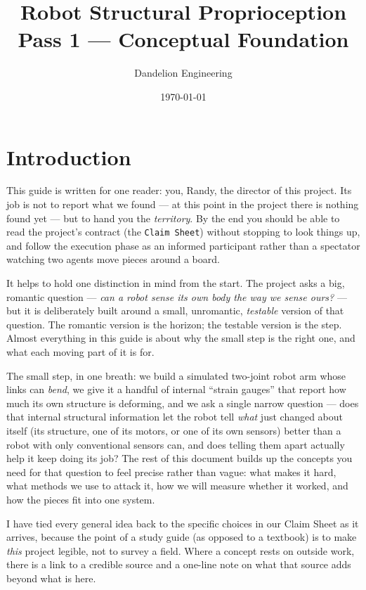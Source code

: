 \documentclass[12pt]{article}
\title{Robot Structural Proprioception \\ Pass 1 --- Conceptual Foundation}
\author{Dandelion Engineering}
\date{\today}
\begin{document}
\maketitle
\begingroup
\small
\setlength{\parskip}{0pt}
\tableofcontents
\endgroup
\newpage

\section{Introduction}

This guide is written for one reader: you, Randy, the director of this project. Its job is not to report what we found --- at this point in the project there is nothing found yet --- but to hand you the \emph{territory}. By the end you should be able to read the project's contract (the \texttt{Claim Sheet}) without stopping to look things up, and follow the execution phase as an informed participant rather than a spectator watching two agents move pieces around a board.

It helps to hold one distinction in mind from the start. The project asks a big, romantic question --- \emph{can a robot sense its own body the way we sense ours?} --- but it is deliberately built around a small, unromantic, \emph{testable} version of that question. The romantic version is the horizon; the testable version is the step. Almost everything in this guide is about why the small step is the right one, and what each moving part of it is for.

The small step, in one breath: we build a simulated two-joint robot arm whose links can \emph{bend}, we give it a handful of internal ``strain gauges'' that report how much its own structure is deforming, and we ask a single narrow question --- does that internal structural information let the robot tell \emph{what} just changed about itself (its structure, one of its motors, or one of its own sensors) better than a robot with only conventional sensors can, and does telling them apart actually help it keep doing its job? The rest of this document builds up the concepts you need for that question to feel precise rather than vague: what makes it hard, what methods we use to attack it, how we will measure whether it worked, and how the pieces fit into one system.

I have tied every general idea back to the specific choices in our Claim Sheet as it arrives, because the point of a study guide (as opposed to a textbook) is to make \emph{this} project legible, not to survey a field. Where a concept rests on outside work, there is a link to a credible source and a one-line note on what that source adds beyond what is here.
\end{document}
